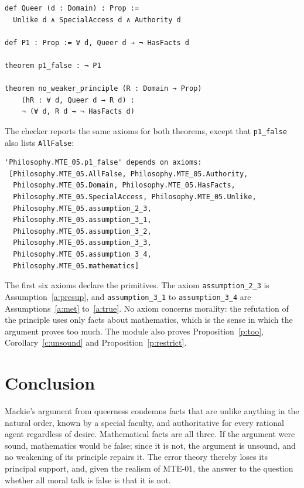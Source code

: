 \documentclass{situationist-preprint}
\begin{document}
\begin{lstlisting}
def Queer (d : Domain) : Prop :=
  Unlike d ∧ SpecialAccess d ∧ Authority d

def P1 : Prop := ∀ d, Queer d → ¬ HasFacts d

theorem p1_false : ¬ P1

theorem no_weaker_principle (R : Domain → Prop)
    (hR : ∀ d, Queer d → R d) :
    ¬ (∀ d, R d → ¬ HasFacts d)
\end{lstlisting}

The checker reports the same axioms for both theorems, except that \texttt{p1\_false} also lists \texttt{AllFalse}:

\begin{lstlisting}
'Philosophy.MTE_05.p1_false' depends on axioms:
 [Philosophy.MTE_05.AllFalse, Philosophy.MTE_05.Authority,
  Philosophy.MTE_05.Domain, Philosophy.MTE_05.HasFacts,
  Philosophy.MTE_05.SpecialAccess, Philosophy.MTE_05.Unlike,
  Philosophy.MTE_05.assumption_2_3,
  Philosophy.MTE_05.assumption_3_1,
  Philosophy.MTE_05.assumption_3_2,
  Philosophy.MTE_05.assumption_3_3,
  Philosophy.MTE_05.assumption_3_4,
  Philosophy.MTE_05.mathematics]
\end{lstlisting}

The first six axioms declare the primitives. The axiom \texttt{assumption\_2\_3} is Assumption~\ref{a:presup}, and \texttt{assumption\_3\_1} to \texttt{assumption\_3\_4} are Assumptions~\ref{a:met} to~\ref{a:true}. No axiom concerns morality: the refutation of the principle uses only facts about mathematics, which is the sense in which the argument proves too much. The module also proves Proposition~\ref{p:too}, Corollary~\ref{c:unsound} and Proposition~\ref{p:restrict}.

\section{Conclusion}

Mackie's argument from queerness condemns facts that are unlike anything in the natural order, known by a special faculty, and authoritative for every rational agent regardless of desire. Mathematical facts are all three. If the argument were sound, mathematics would be false; since it is not, the argument is unsound, and no weakening of its principle repairs it. The error theory thereby loses its principal support, and, given the realism of MTE-01, the answer to the question whether all moral talk is false is that it is not.
\end{document}
